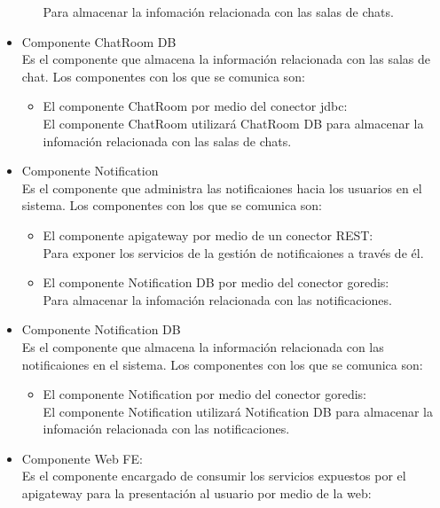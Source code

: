 \begin{itemize}
\begin{itemize}
        Para almacenar la infomación relacionada con las salas de chats.
    \end{itemize}
    \item Componente ChatRoom DB\\
    Es el componente que almacena la información relacionada con las salas de chat.
    Los componentes con los que se comunica son:
    \begin{itemize}
        \item El componente ChatRoom por medio del conector jdbc:\\
        El componente ChatRoom utilizará ChatRoom DB para almacenar la infomación relacionada con las salas de chats.
    \end{itemize}
    \item Componente Notification\\
    Es el componente que administra las notificaiones hacia los usuarios en el sistema.
    Los componentes con los que se comunica son:
    \begin{itemize}
        \item El componente api\textunderscore gateway por medio de un conector REST:\\
        Para exponer los servicios de la gestión de notificaiones a través de él.
        \item El componente Notification DB por medio del conector go\textunderscore redis:\\
        Para almacenar la infomación relacionada con las notificaciones.
    \end{itemize}
    \item Componente Notification DB\\
    Es el componente que almacena la información relacionada con las notificaiones en el sistema.
    Los componentes con los que se comunica son:
    \begin{itemize}
        \item El componente Notification por medio del conector go\textunderscore redis:\\
        El componente Notification utilizará Notification DB para almacenar la infomación relacionada con las notificaciones.
    \end{itemize}
    \item Componente Web FE:\\
    Es el componente encargado de consumir los servicios expuestos por el api\textunderscore gateway para la presentación al usuario por medio de la web:\\

\end{itemize}
